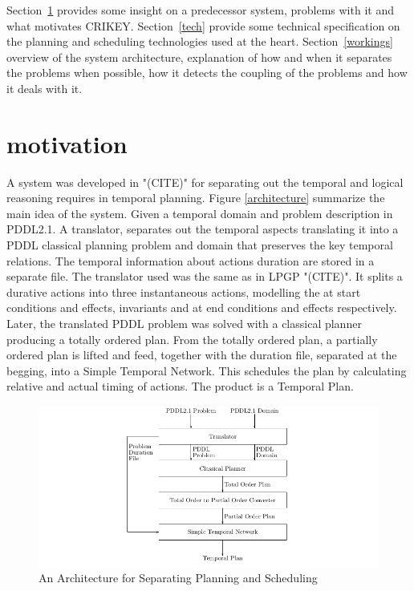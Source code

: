 \documentclass
[a4paper
,english
,parskip=half
,bibliography=totoc
]{scrreprt}
\begin{document}
    Section~\ref{motivation} provides some insight on a predecessor system, problems with it and what motivates CRIKEY.
    Section~\ref{tech} provide some technical specification on the planning and scheduling technologies used at the heart.
    Section~\ref{workings} overview of the system architecture, explanation of how and when it separates the problems when possible, how it detects the coupling of the  problems and how it deals with it.
    
    \section{motivation} \label{motivation}
    A system was developed in "(CITE)" for separating out the temporal and logical reasoning requires in temporal planning. Figure \ref{architecture} summarize the main idea of the system. Given a temporal domain and problem description in PDDL2.1. A translator, separates out the temporal aspects translating it into a PDDL classical planning problem and domain that preserves the key temporal relations. 
    The temporal information about actions duration are stored in a separate file. The translator used was the same as in LPGP "(CITE)". It splits a durative actions into three instantaneous actions, modelling the at start conditions and effects, invariants and at end conditions and effects respectively. Later, the translated PDDL problem was solved with a classical planner producing a totally ordered plan.
    From the totally ordered plan, a partially ordered plan is lifted and feed, together with the duration file, separated at the begging, into a Simple Temporal Network. This schedules the plan by calculating relative and actual timing of actions. The product is a Temporal Plan.

    \begin{figure}[h]
        \centering    
        \includegraphics[width=15cm]{architecture.png}
        \caption{An Architecture for Separating Planning and Scheduling}
         \label{fig:architecture}
    \end{figure}
    
\end{document}
